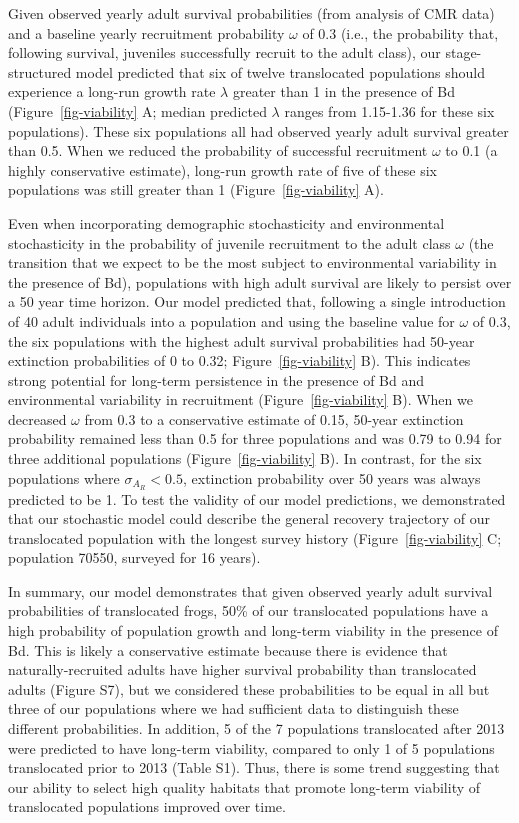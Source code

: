 \documentclass[9pt,twocolumn,twoside,lineno]{pnas-new}
\begin{document}
Given observed yearly adult survival probabilities (from analysis of CMR
data) and a baseline yearly recruitment probability \(\omega\) of 0.3
(i.e., the probability that, following survival, juveniles successfully
recruit to the adult class), our stage-structured model predicted that
six of twelve translocated populations should experience a long-run
growth rate \(\lambda\) greater than 1 in the presence of Bd
(Figure~\ref{fig-viability} A; median predicted \(\lambda\) ranges from
1.15-1.36 for these six populations). These six populations all had
observed yearly adult survival greater than 0.5. When we reduced the
probability of successful recruitment \(\omega\) to 0.1 (a highly
conservative estimate), long-run growth rate of five of these six
populations was still greater than 1 (Figure~\ref{fig-viability} A).

Even when incorporating demographic stochasticity and environmental
stochasticity in the probability of juvenile recruitment to the adult
class \(\omega\) (the transition that we expect to be the most subject
to environmental variability in the presence of Bd), populations with
high adult survival are likely to persist over a 50 year time horizon.
Our model predicted that, following a single introduction of 40 adult
individuals into a population and using the baseline value for
\(\omega\) of 0.3, the six populations with the highest adult survival
probabilities had 50-year extinction probabilities of 0 to 0.32;
Figure~\ref{fig-viability} B). This indicates strong potential for
long-term persistence in the presence of Bd and environmental
variability in recruitment (Figure~\ref{fig-viability} B). When we
decreased \(\omega\) from 0.3 to a conservative estimate of 0.15,
50-year extinction probability remained less than 0.5 for three
populations and was 0.79 to 0.94 for three additional populations
(Figure~\ref{fig-viability} B). In contrast, for the six populations
where \(\sigma_{A_R} < 0.5\), extinction probability over 50 years was
always predicted to be 1. To test the validity of our model predictions,
we demonstrated that our stochastic model could describe the general
recovery trajectory of our translocated population with the longest
survey history (Figure~\ref{fig-viability} C; population 70550, surveyed
for 16 years).

In summary, our model demonstrates that given observed yearly adult
survival probabilities of translocated frogs, 50\% of our translocated
populations have a high probability of population growth and long-term
viability in the presence of Bd. This is likely a conservative estimate
because there is evidence that naturally-recruited adults have higher
survival probability than translocated adults
(Figure S7), but we considered these
probabilities to be equal in all but three of our populations where we
had sufficient data to distinguish these different probabilities. In
addition, 5 of the 7 populations translocated after 2013 were predicted
to have long-term viability, compared to only 1 of 5 populations
translocated prior to 2013 (Table S1). Thus,
there is some trend suggesting that our ability to select high quality
habitats that promote long-term viability of translocated populations
improved over time.
\end{document}
